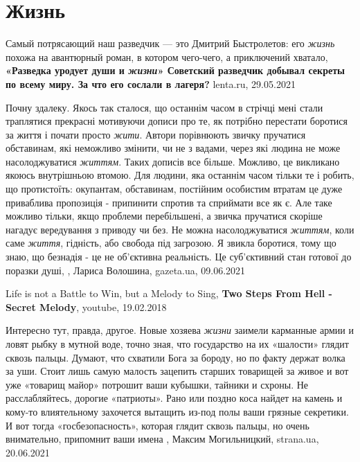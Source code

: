  
 
 
 
 
\chapter{Жизнь}
\label{sec:slova.zhizn}

Самый потрясающий наш разведчик — это Дмитрий Быстролетов: его \emph{жизнь}
похожа на авантюрный роман, в котором чего-чего, а приключений хватало,
\textbf{«Разведка уродует души и \emph{жизни}» Советский разведчик добывал
секреты по всему миру. За что его сослали в лагеря?} lenta.ru, 29.05.2021

Почну здалеку. Якось так сталося, що останнім часом в стрічці мені стали
траплятися прекрасні мотивуючи дописи про те, як потрібно перестати боротися за
життя і почати просто \emph{жити}. Автори порівнюють звичку пручатися
обставинам, які неможливо змінити, чи не з вадами, через які людина не може
насолоджуватися \emph{життям}. Таких дописів все більше. Можливо, це викликано
якоюсь внутрішньою втомою. Для людини, яка останнім часом тільки те і робить,
що протистоїть: окупантам, обставинам, постійним особистим втратам це дуже
приваблива пропозиція - припинити спротив та сприймати все як є. Але таке
можливо тільки, якщо проблеми перебільшені, а звичка пручатися скоріше нагадує
вередування з приводу чи без. Не можна насолоджуватися \emph{життям}, коли саме
\emph{життя}, гідність, або свобода під загрозою. Я звикла боротися, тому що
знаю, що безнадія - це не об'єктивна реальність. Це суб'єктивний стан готової
до поразки душі, , Лариса Волошина, gazeta.ua, 09.06.2021

Life is not a Battle to Win, but a Melody to Sing,
\textbf{Two Steps From Hell - Secret Melody},
youtube, 19.02.2018

Интересно тут, правда, другое. Новые хозяева \emph{жизни} заимели карманные армии и
ловят рыбку в мутной воде, точно зная, что государство на их «шалости» глядит
сквозь пальцы.  Думают, что схватили Бога за бороду, но по факту держат волка
за уши. Стоит лишь самую малость зацепить старших товарищей за живое и вот уже
«товарищ майор» потрошит ваши кубышки, тайники и схроны.  Не расслабляйтесь,
дорогие «патриоты». Рано или поздно коса найдет на камень и кому-то
влиятельному захочется вытащить из-под полы ваши грязные секретики. И вот тогда
«госбезопасность», которая глядит сквозь пальцы, но очень внимательно,
припомнит ваши имена
, 
Максим Могильницкий, strana.ua, 20.06.2021

